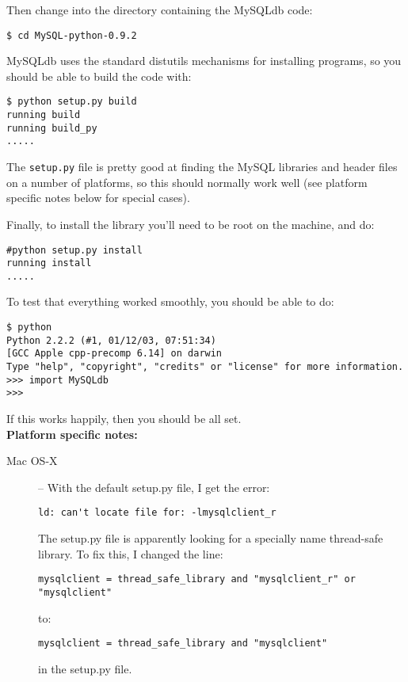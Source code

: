 \documentclass{article}
\begin{document}
Then change into the directory containing the MySQLdb code:

\begin{verbatim}
$ cd MySQL-python-0.9.2
\end{verbatim}

MySQLdb uses the standard distutils mechanisms for installing programs,
so you should be able to build the code with:

\begin{verbatim}
$ python setup.py build
running build
running build_py
.....
\end{verbatim}

The \verb|setup.py| file is pretty good at finding the MySQL libraries
and header files on a number of platforms, so this should normally work
well (see platform specific notes below for special cases).

Finally, to install the library you'll need to be root on the machine,
and do:

\begin{verbatim}
#python setup.py install
running install
.....
\end{verbatim}

To test that everything worked smoothly, you should be able to do:

\begin{verbatim}
$ python
Python 2.2.2 (#1, 01/12/03, 07:51:34) 
[GCC Apple cpp-precomp 6.14] on darwin
Type "help", "copyright", "credits" or "license" for more information.
>>> import MySQLdb
>>>
\end{verbatim}

If this works happily, then you should be all set.
\\


\textbf{\large Platform specific notes:}
\begin{description}
  \item[Mac OS-X] -- With the default setup.py file, I get the error:

  \verb|ld: can't locate file for: -lmysqlclient_r|
  
  The setup.py file
  is apparently looking for a specially name thread-safe library. To fix
  this, I changed the line:
  
\verb|mysqlclient = thread_safe_library and "mysqlclient_r" or "mysqlclient"|

  to:

\verb|mysqlclient = thread_safe_library and "mysqlclient"|

  in the setup.py file.


\end{description}
\end{document}
